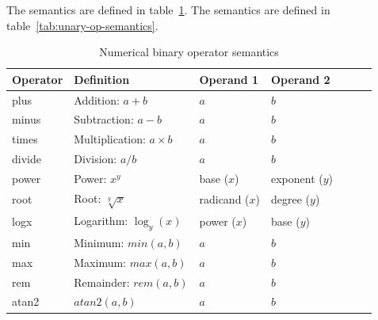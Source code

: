 \begin{valrules}
 The semantics are defined in
table~\ref{tab:bin-op-semantics}.
 The semantics are defined in
table~\ref{tab:unary-op-semantics}.
\end{valrules}


%

\begin{table}[ht!]
\begin{center}
\small
\begin{tabular}{lllllll}\toprule
Operator & Definition & Operand 1 & Operand 2 \\\midrule
plus & Addition: $a +b$ & $a$ & $b$ \\
minus & Subtraction: $a - b$ & $a$ & $b$ \\
times & Multiplication: $a \times b$ & $a$ & $b$ \\
divide & Division: $a/b$  & $a$ & $b$ \\
power & Power: $x^y$ & base ($x$) & exponent ($y$) \\
root & Root: $\sqrt[y]{x}$ & radicand ($x$) & degree ($y$) \\
logx & Logarithm: $\log_y(x)$ & power ($x$) & base ($y$) \\
min & Minimum: $min(a,b)$ & $a$ & $b$ \\ 
max & Maximum: $max(a,b)$ & $a$ & $b$ \\ 
rem & Remainder: $rem(a,b)$ & $a$ & $b$ \\ 
atan2 & $atan2(a,b)$ & $a$ & $b$ \\ \bottomrule
\end{tabular}
\end{center}
\caption{Numerical binary operator semantics}
\label{tab:bin-op-semantics}
\end{table}%


